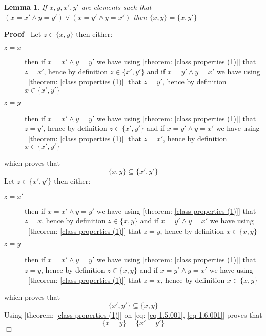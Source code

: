 \documentclass{book}
\newenvironment{proof}{\noindent\textbf{Proof\ }}{\hspace*{\fill}$\Box$\medskip}
\newtheorem{lemma}{Lemma}
\begin{document}
\begin{lemma}
  \label{element equality of unordered pairs (1)}If $x, y, x', y'$ are
  elements such that $(x = x' \wedge y = y') \vee (x = y' \wedge y = x')$ then
  $\{ x, y \} = \{ x, y' \}$
\end{lemma}

\begin{proof}
  Let $z \in \{ x, y \}$ then either:
  \begin{description}
    \item[$z = x$] then if $x = x' \wedge y = y'$ we have using [theorem:
    \ref{class properties (1)}] that $z = x'$, hence by definition $z \in \{
    x', y' \}$ and if $x = y' \wedge y = x'$ we have using \ [theorem:
    \ref{class properties (1)}] that $z = y'$, hence by definition $x \in \{
    x', y' \}$
    
    \item[$z = y$] then if $x = x' \wedge y = y'$ we have using [theorem:
    \ref{class properties (1)}] that $z = y'$, hence by definition $z \in \{
    x', y' \}$ and if $x = y' \wedge y = x'$ we have using \ [theorem:
    \ref{class properties (1)}] that $z = x'$, hence by definition $x \in \{
    x', y' \}$
  \end{description}
  which proves that
  \begin{equation}
    \label{eq 1.5.001} \{ x, y \} \subseteq \{ x', y' \}
  \end{equation}
  Let $z \in \{ x', y' \}$ then either:
  \begin{description}
    \item[$z = x'$] then if $x = x' \wedge y = y'$ we have using [theorem:
    \ref{class properties (1)}] that $z = x$, hence by definition $z \in \{ x,
    y \}$ and if $x = y' \wedge y = x'$ we have using \ [theorem: \ref{class
    properties (1)}] that $z = y$, hence by definition $x \in \{ x, y \}$
    
    \item[$z = y$] then if $x = x' \wedge y = y'$ we have using [theorem:
    \ref{class properties (1)}] that $z = y$, hence by definition $z \in \{ x,
    y \}$ and if $x = y' \wedge y = x'$ we have using \ [theorem: \ref{class
    properties (1)}] that $z = x$, hence by definition $x \in \{ x, y \}$
  \end{description}
  which proves that
  \begin{equation}
    \label{eq 1.6.001} \{ x', y' \} \subseteq \{ x, y \}
  \end{equation}
  Using [theorem: \ref{class properties (1)}] on [eq: \ref{eq 1.5.001},
  \ref{eq 1.6.001}] proves that
  \[ \{ x = y \} = \{ x' = y' \} \]
\end{proof}
\end{document}
